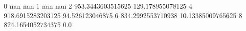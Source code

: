 0 nan nan
1 nan nan
2 953.3443603515625 129.178955078125
4 918.6915283203125 94.526123046875
6 834.2992553710938 10.13385009765625
8 824.1654052734375 0.0
